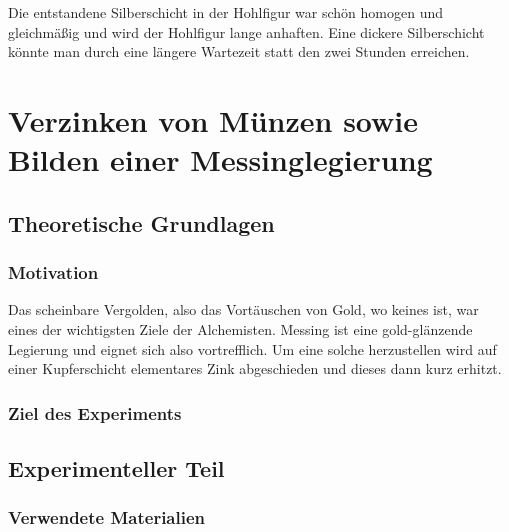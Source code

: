 \documentclass{article}
\begin{document}
      Die entstandene Silberschicht in der Hohlfigur war schön homogen und gleichmäßig und wird der Hohlfigur lange anhaften. Eine dickere Silberschicht könnte man durch eine längere Wartezeit statt den zwei Stunden erreichen. 
  
  
  \section{Verzinken von Münzen sowie Bilden einer Messinglegierung}
  
    \subsection{Theoretische Grundlagen}
      
      \subsubsection{Motivation}
        
        Das scheinbare Vergolden, also das Vortäuschen von Gold, wo keines ist, war eines der wichtigsten Ziele der Alchemisten. Messing ist eine gold-glänzende Legierung und eignet sich also vortrefflich. Um eine solche herzustellen wird auf einer Kupferschicht elementares Zink abgeschieden und dieses dann kurz erhitzt. 
        
      \subsubsection{Ziel des Experiments}
              
    
    \subsection{Experimenteller Teil}
    
      \subsubsection{Verwendete Materialien}
      
\end{document}

